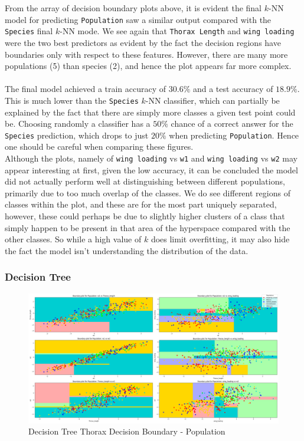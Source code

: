 \documentclass{article}
\begin{document}
From the array of decision boundary plots above, it is evident the final $k$-NN model for predicting \texttt{Population} saw a similar output compared with the \texttt{Species} final $k$-NN mode. We see again that \texttt{Thorax Length} and \texttt{wing loading} were the two best predictors as evident by the fact the decision regions have boundaries only with respect to these features. However, there are many more populations (5) than species (2), and hence the plot appears far more complex. \\
\\
The final model achieved a train accuracy of $30.6\%$ and a test accuracy of $18.9\%$. This is much lower than the \texttt{Species} $k$-NN classifier, which can partially be explained by the fact that there are simply more classes a given test point could be. Choosing randomly a classifier has a $50\%$ chance of a correct answer for the \texttt{Species} prediction, which drops to just $20\%$ when predicting \texttt{Population}. Hence one should be careful when comparing these figures. \\

\newpage
Although the plots, namely of \texttt{wing loading} vs \texttt{w1} and \texttt{wing loading} vs \texttt{w2} may appear interesting at first, given the low accuracy, it can be concluded the model did not actually perform well at distinguishing between different populations, primarily due to too much overlap of the classes. We do see different regions of classes within the plot, and these are for the most part uniquely separated, however, these could perhaps be due to slightly higher clusters of a class that simply happen to be present in that area of the hyperspace compared with the other classes. So while a high value of $k$ does limit overfitting, it may also hide the fact the model isn't understanding the distribution of the data.

\newpage
\subsubsection{Decision Tree}

\begin{figure}[htb]
    \centering
    \includegraphics[width=0.8\columnwidth]{plots/dt_Thorax_decision_boundaries_Population.png}
    \caption{Decision Tree Thorax Decision Boundary - Population}
    \label{fig:dt_thorax_db_pop}
\end{figure}
\end{document}

